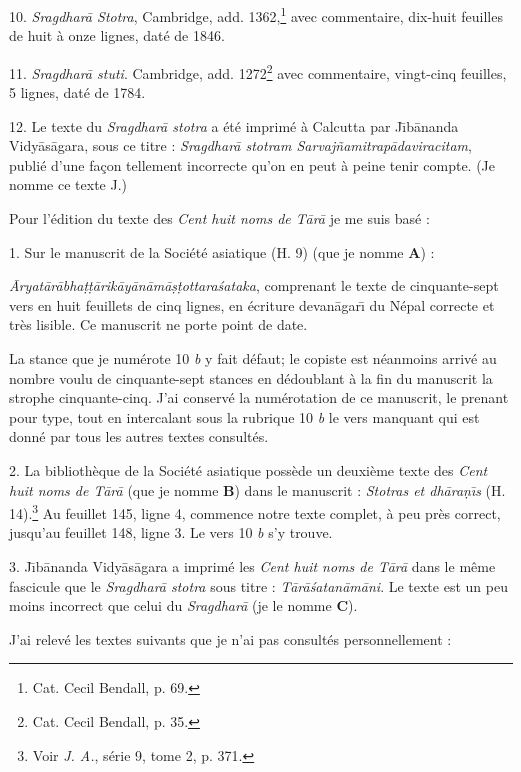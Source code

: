 \documentclass[a4paper, 11pt, oneside, french]{article}
\begin{document}
10. \emph{Sragdhar\={a} Stotra}, Cambridge, add. 1362,\footnote{Cat. Cecil Bendall, p. 69.} avec commentaire, dix-huit feuilles de huit à onze lignes, daté de 1846.

11. \emph{Sragdhar\={a} stuti}. Cambridge, add. 1272\footnote{Cat. Cecil Bendall, p. 35.} avec commentaire, vingt-cinq feuilles, 5 lignes, daté de 1784.

12. Le texte du \emph{Sragdhar\={a} stotra} a été imprimé à Calcutta par J\={\i}b\={a}nanda Vidy\={a}s\={a}gara, sous ce titre : \emph{Sragdhar\={a} stotram Sarvaj\~{n}amitrap\={a}daviracitam}, publié d'une façon tellement incorrecte qu'on en peut à peine tenir compte. (Je nomme ce texte J.)

\bigskip

Pour l'édition du texte des \emph{Cent huit noms de T\={a}r\={a}} je me suis basé :

1. Sur le manuscrit de la Société asiatique (H. 9) (que je nomme \textbf{A}) :

\emph{\={A}ryat\={a}r\={a}bha\d{t}\d{t}\={a}rik\={a}y\={a}n\={a}m\={a}\d{s}\d{t}ottara\'{s}ataka}, comprenant le texte de cinquante-sept vers en huit feuillets de cinq lignes, en écriture devan\={a}gar\={\i} du Népal correcte et très lisible. Ce manuscrit ne porte point de date.

La stance que je numérote 10 \emph{b} y fait défaut; le copiste est néanmoins arrivé au nombre voulu de cinquante-sept stances en dédoublant à la fin du manuscrit la strophe cinquante-cinq. J'ai conservé la numérotation de ce manuscrit, le prenant pour type, tout en intercalant sous la rubrique 10 \emph{b} le vers manquant qui est donné par tous les autres textes consultés.

2. La bibliothèque de la Société asiatique possède un deuxième texte des \emph{Cent huit noms de T\={a}r\={a}} (que je nomme \textbf{B}) dans le manuscrit : \emph{Stotras et dh\={a}ra\d{n}\={\i}s} (H. 14).\footnote{Voir \emph{J. A.}, série 9, tome 2, p. 371.} Au feuillet 145, ligne 4, commence notre texte complet, à peu près correct, jusqu'au feuillet 148, ligne 3. Le vers 10 \emph{b} s'y trouve.

3. J\={\i}b\={a}nanda Vidy\={a}s\={a}gara a imprimé les \emph{Cent huit noms de T\={a}r\={a}} dans le même fascicule que le \emph{Sragdhar\={a} stotra} sous titre : \emph{T\={a}r\={a}\'{s}atan\={a}m\={a}ni}. Le texte est un peu moins incorrect que celui du \emph{Sragdhar\={a}} (je le nomme \textbf{C}).

J'ai relevé les textes suivants que je n'ai pas consultés personnellement :
\end{document}
